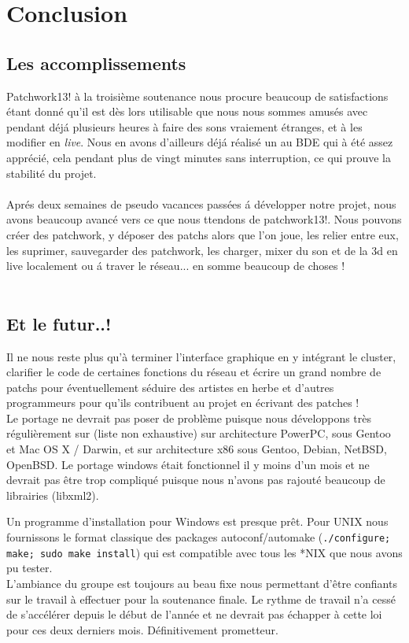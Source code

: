 \chapter{Conclusion}

\section{Les accomplissements}
Patchwork13! \`a la troisi\`eme soutenance nous procure beaucoup de 
satisfactions \'etant donn\'e qu'il est d\`es lors utilisable que nous nous
sommes amus\'es avec pendant d\'ej\'a plusieurs heures \`a faire des sons
vraiement \'etranges, et \`a les modifier en {\em live}.
Nous en avons d'ailleurs d\'ej\'a r\'ealis\'e un au BDE qui
\`a \'et\'e assez appr\'eci\'e, cela pendant plus de vingt minutes
sans interruption, ce qui prouve la stabilit\'e du projet.\\
\\
Apr\'es deux semaines de pseudo vacances pass\'ees \'a d\'evelopper
notre projet, nous avons beaucoup avanc\'e vers ce que nous 
ttendons de patchwork13!. Nous pouvons cr\'eer des patchwork,
y d\'eposer des patchs alors que l'on joue, les relier entre eux, 
les suprimer, sauvegarder des patchwork, les charger, mixer du son
et de la 3d en live localement ou \'a traver le r\'eseau...
en somme beaucoup de choses !\\
\\

\section{Et le futur..!}

Il ne nous reste plus qu'\`a terminer l'interface graphique
en y int\'egrant le cluster, clarifier le code de certaines
fonctions du r\'eseau et \'ecrire un grand nombre de patchs
pour \'eventuellement s\'eduire des artistes en herbe et d'autres
programmeurs pour qu'ils contribuent au projet en \'ecrivant des patches !\\

Le portage ne devrait pas poser de probl\`eme puisque nous d\'eveloppons
tr\`es r\'eguli\`erement sur (liste non exhaustive) sur architecture PowerPC,
sous Gentoo et Mac OS X / Darwin, et sur architecture x86 sous Gentoo,
Debian, NetBSD, OpenBSD. Le portage windows \'etait fonctionnel il y
moins d'un mois et ne devrait pas \^etre trop compliqu\'e puisque nous
n'avons pas rajout\'e beaucoup de librairies (libxml2).\\

\newpage

Un programme d'installation pour Windows est presque pr\^et. Pour UNIX
nous fournissons le format classique des packages autoconf/automake
({\tt ./configure; make; sudo make install}) qui est compatible avec
tous les *NIX que nous avons pu tester.\\

L'ambiance du groupe est toujours au beau fixe nous permettant d'\^etre 
confiants sur le travail \`a effectuer pour la soutenance finale.
Le rythme de travail n'a cess\'e de s'acc\'el\'erer depuis le
d\'ebut de l'ann\'ee et ne devrait pas \'echapper \`a cette loi
pour ces deux derniers mois. D\'efinitivement prometteur.

